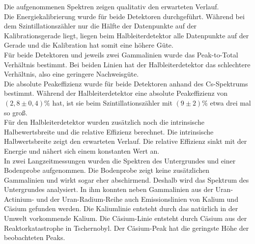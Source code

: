 Die aufgenommenen Spektren zeigen qualitativ den erwarteten Verlauf.\\

 Die Energiekalibrierung wurde für beide Detektoren durchgeführt. Während bei dem Szintillationszähler nur die Hälfte der Datenpunkte auf der Kalibrationsgerade liegt, liegen beim Halbleiterdetektor alle Datenpunkte auf der Gerade und die Kalibration hat somit eine höhere Güte. \\

Für beide Detektoren und jeweils zwei Gammalinien wurde das Peak-to-Total Verhältnis bestimmt. Bei beiden Linien hat der Halbleiterdetektor das schlechtere Verhältnis, also eine geringere Nachweisgüte.\\

Die absolute Peakeffizienz wurde für beide Detektoren anhand des Cs-Spektrums bestimmt. Während der Halbleiterdetektor eine absolute Peakeffizienz von $(2,8 \pm 0,4) \%$ hat, ist sie beim Szintillationszähler mit $(9 \pm 2)\%$ etwa drei mal so groß.\\

Für den Halbleiterdetektor wurden zusätzlich noch die intrinsische Halbewertsbreite und die relative Effizienz berechnet. Die intrinsische Halbwertsbreite zeigt den erwarteten Verlauf. Die relative Effizienz sinkt mit der Energie und nähert sich einem konstanten Wert an.\\

In zwei Langzeitmessungen wurden die Spektren des Untergrundes und einer Bodenprobe aufgenommen. Die Bodenprobe zeigt keine zusätzlichen Gammalinien und wirkt sogar eher abschirmend. Deshalb wird das Spektrum des Untergrundes analysiert. In ihm konnten neben Gammalinien aus der Uran-Actinium- und der Uran-Radium-Reihe auch Emissionslinien von Kalium und Cäsium gefunden werden. Die Kaliumlinie entsteht durch das natürlich in der Umwelt vorkommende Kalium. Die Cäsium-Linie entsteht durch Cäsium aus der Reaktorkatastrophe in Tschernobyl. Der Cäsium-Peak hat die geringste Höhe der beobachteten Peaks. 
